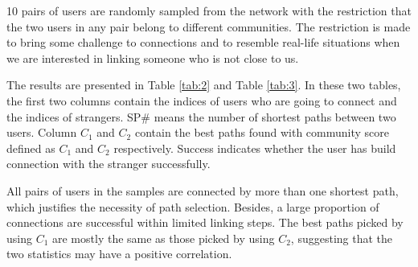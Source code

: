 \documentclass[journal]{IEEEtran}
\begin{document}
10 pairs of users are randomly sampled from the network with the restriction that the two users in any pair belong to different communities. The restriction is made to bring some challenge to connections and to resemble real-life situations when we are interested in linking someone who is not close to us. 

The results are presented in Table \ref{tab:2} and Table \ref{tab:3}. In these two tables, the first two columns contain the indices of users who are going to connect and the indices of strangers. SP$\#$ means the number of shortest paths between two users. Column $C_{1}$ and $C_{2}$ contain the best paths found with community score defined as $C_{1}$ and $C_{2}$ respectively. Success indicates whether the user has build connection with the stranger successfully.

All pairs of users in the samples are connected by more than one shortest path, which justifies the necessity of path selection. Besides, a large proportion of connections are successful within limited linking steps. The best paths picked by using $C_{1}$ are mostly the same as those picked by using $C_{2}$, suggesting that the two statistics may have a positive correlation.
\end{document}
